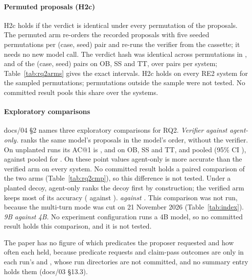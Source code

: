 \paragraph{Permuted proposals (H2c)}
H2c holds if the verdict is identical under every permutation of the proposals.
The permuted arm re-orders the recorded  proposals with five seeded permutations per (case, seed) pair and re-runs the verifier from the cassette; it needs no new model call.
The verdict hash was identical across permutations in ,  and  of the (case, seed) pairs on OB, SS and TT, over  pairs per system; Table~\ref{tab:rq2arms} gives the exact intervals.
H2c holds on every RE2 system for the sampled permutations; permutations outside the sample were not tested.
No committed result pools this share over the systems.

\paragraph{Exploratory comparisons}
docs/04 §2 names three exploratory comparisons for RQ2.
\emph{Verifier against agent-only.}
 ranks the same model's proposals in the model's order, without the verifier.
On unplanted runs its AC@1 is ,  and  on OB, SS and TT, and  pooled (95\% CI ), against  pooled for .
On these point values agent-only is more accurate than the verified arm on every system.
No committed result holds a paired comparison of the two arms (Table~\ref{tab:rq2cmp}), so this difference is not tested.
Under a planted decoy, agent-only ranks the decoy first by construction; the verified arm keeps most of its accuracy ( against ).
\emph{ against .}
This comparison was not run, because the multi-turn  mode was cut on 21 November 2026 (Table~\ref{tab:index}).
\emph{9B against 4B.}
No experiment configuration runs a 4B model, so no committed result holds this comparison, and it is not tested.

The paper has no figure of which predicates the proposer requested and how often each held, because predicate requests and claim-pass outcomes are only in each run's  and , whose run directories are not committed, and no summary entry holds them (docs/03 §13.3).
